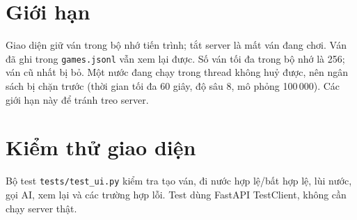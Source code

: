 \section{Giới hạn}
Giao diện giữ ván trong bộ nhớ tiến trình; tắt server là mất ván đang chơi. Ván đã ghi trong
\texttt{games.jsonl} vẫn xem lại được. Số ván tối đa trong bộ nhớ là 256; ván cũ nhất bị bỏ.
Một nước đang chạy trong thread không huỷ được, nên ngân sách bị chặn trước (thời gian tối đa
60 giây, độ sâu 8, mô phỏng 100\,000). Các giới hạn này để tránh treo server.

\section{Kiểm thử giao diện}
Bộ test \texttt{tests/test\_ui.py} kiểm tra tạo ván, đi nước hợp lệ/bất hợp lệ, lùi nước, gọi
AI, xem lại và các trường hợp lỗi. Test dùng FastAPI TestClient, không cần chạy server thật.